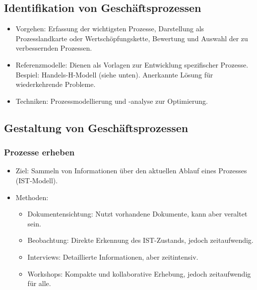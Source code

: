 \subsection{Identifikation von Geschäftsprozessen}
\begin{itemize}
    \item Vorgehen: Erfassung der wichtigsten Prozesse, Darstellung als Prozesslandkarte oder Wertschöpfungskette, Bewertung und Auswahl der zu verbessernden Prozessen.
    \item Referenzmodelle: Dienen als Vorlagen zur Entwicklung spezifischer Prozesse. Bespiel: Handels-H-Modell (siehe unten). Anerkannte Lösung für wiederkehrende Probleme.
    \item Techniken: Prozessmodellierung und -analyse zur Optimierung.
\end{itemize}

\subsection{Gestaltung von Geschäftsprozessen}
    \subsubsection{Prozesse erheben}
        \begin{itemize}
            \item Ziel: Sammeln von Informationen über den aktuellen Ablauf eines Prozesses (IST-Modell).
            \item Methoden:
            \begin{itemize}
                \item Dokumentensichtung: Nutzt vorhandene Dokumente, kann aber veraltet sein.
                \item Beobachtung: Direkte Erkennung des IST-Zustands, jedoch zeitaufwendig.
                \item Interviews: Detaillierte Informationen, aber zeitintensiv.
                \item Workshops: Kompakte und kollaborative Erhebung, jedoch zeitaufwendig für alle.
            \end{itemize}
        \end{itemize}

